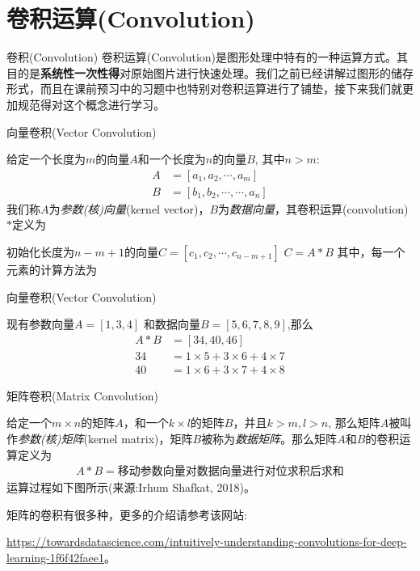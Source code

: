 \documentclass[handout]{beamer}
\begin{document}
\section{卷积运算(Convolution)}


\begin{frame}{卷积(Convolution)}
卷积运算(Convolution)是图形处理中特有的一种运算方式。其目的是\textbf{系统性一次性得}对原始图片进行快速处理。我们之前已经讲解过图形的储存形式，而且在课前预习中的习题中也特别对卷积运算进行了铺垫，接下来我们就更加规范得对这个概念进行学习。
\end{frame}


\begin{frame}{向量卷积(Vector Convolution)}
\begin{definition}
{\footnotesize
	给定一个长度为$m$的向量$A$和一个长度为$n$的向量$B$, 其中$n > m$:
	\begin{align*}
		A & = [a_1, a_2, \cdots, a_m ] \\
		B & = [b_1, b_2, \cdots, \cdots, a_n]
	\end{align*}
	我们称$A$为\textit{参数(核)向量}(kernel vector)，$B$为\textit{数据向量}，其卷积运算(convolution)$*$定义为
\begin{algorithm}[H]
	\SetAlgoLined
	\caption{Convolution Operation}
	初始化长度为$n-m+1$的向量$C = [c_1, c_2, \cdots, c_{n-m+1}]$ \;
	$C = A * B $ \; 其中，每一个元素的计算方法为\;
	\end{algorithm}
}
\end{definition}
\end{frame}

\begin{frame}{向量卷积(Vector Convolution)}
\begin{example}
	现有参数向量$A=[1, 3, 4]$ 和数据向量$B = [5, 6, 7 , 8 , 9]$,那么
	\begin{align*}
		A * B & = [34, 40, 46]\\
		34 & = 1\times 5 + 3 \times 6 + 4 \times 7 \\
		40 & = 1 \times 6 + 3 \times 7 + 4 \times 8 
	\end{align*}
\end{example}
\end{frame}


\begin{frame}{矩阵卷积(Matrix Convolution)}
\begin{definition}
	给定一个$m \times n$的矩阵$A$，和一个$k \times l$的矩阵$B$，并且$k > m, l > n$, 那么矩阵$A$被叫作\textit{参数(核)矩阵}(kernel matrix)，矩阵$B$被称为\textit{数据矩阵}。那么矩阵$A$和$B$的卷积运算定义为
	\begin{align*}
		A * B = \text{移动参数向量对数据向量进行对位求积后求和}
	\end{align*}
	运算过程如下图所示(来源:Irhum Shafkat, 2018)。
\end{definition}
矩阵的卷积有很多种，更多的介绍请参考该网站:

\url{https://towardsdatascience.com/intuitively-understanding-convolutions-for-deep-learning-1f6f42faee1}。
\end{frame}
\end{document}
